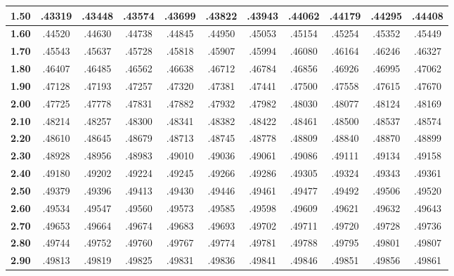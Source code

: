 \begin{tabular}{|c|c|c|c|c|c|c|c|c|c|c|}
\hline
\textbf{ 1.50 } & .43319 & .43448 & .43574 & .43699 & .43822 & .43943 & .44062 & .44179 & .44295 & .44408\\ 
\hline
\textbf{ 1.60 } & .44520 & .44630 & .44738 & .44845 & .44950 & .45053 & .45154 & .45254 & .45352 & .45449\\ 
\hline
\textbf{ 1.70 } & .45543 & .45637 & .45728 & .45818 & .45907 & .45994 & .46080 & .46164 & .46246 & .46327\\ 
\hline
\textbf{ 1.80 } & .46407 & .46485 & .46562 & .46638 & .46712 & .46784 & .46856 & .46926 & .46995 & .47062\\ 
\hline
\textbf{ 1.90 } & .47128 & .47193 & .47257 & .47320 & .47381 & .47441 & .47500 & .47558 & .47615 & .47670\\ 
\hline
\textbf{ 2.00 } & .47725 & .47778 & .47831 & .47882 & .47932 & .47982 & .48030 & .48077 & .48124 & .48169\\ 
\hline
\textbf{ 2.10 } & .48214 & .48257 & .48300 & .48341 & .48382 & .48422 & .48461 & .48500 & .48537 & .48574\\ 
\hline
\textbf{ 2.20 } & .48610 & .48645 & .48679 & .48713 & .48745 & .48778 & .48809 & .48840 & .48870 & .48899\\ 
\hline
\textbf{ 2.30 } & .48928 & .48956 & .48983 & .49010 & .49036 & .49061 & .49086 & .49111 & .49134 & .49158\\ 
\hline
\textbf{ 2.40 } & .49180 & .49202 & .49224 & .49245 & .49266 & .49286 & .49305 & .49324 & .49343 & .49361\\ 
\hline
\textbf{ 2.50 } & .49379 & .49396 & .49413 & .49430 & .49446 & .49461 & .49477 & .49492 & .49506 & .49520\\ 
\hline
\textbf{ 2.60 } & .49534 & .49547 & .49560 & .49573 & .49585 & .49598 & .49609 & .49621 & .49632 & .49643\\ 
\hline
\textbf{ 2.70 } & .49653 & .49664 & .49674 & .49683 & .49693 & .49702 & .49711 & .49720 & .49728 & .49736\\ 
\hline
\textbf{ 2.80 } & .49744 & .49752 & .49760 & .49767 & .49774 & .49781 & .49788 & .49795 & .49801 & .49807\\ 
\hline
\textbf{ 2.90 } & .49813 & .49819 & .49825 & .49831 & .49836 & .49841 & .49846 & .49851 & .49856 & .49861\\ 
\hline
\end{tabular} 

